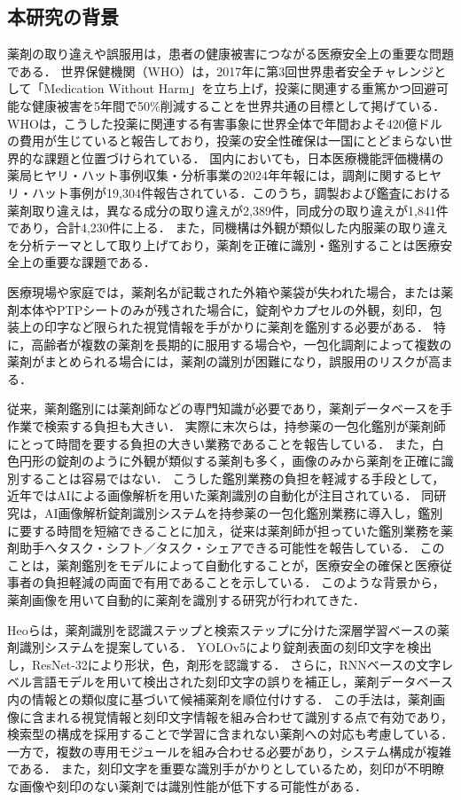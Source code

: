 \documentclass[dvipdfmx]{jsarticle}
\begin{document}
\subsection{本研究の背景}

薬剤の取り違えや誤服用は，患者の健康被害につながる医療安全上の重要な問題である．
世界保健機関（WHO）は，2017年に第3回世界患者安全チャレンジとして「Medication Without Harm」を立ち上げ，投薬に関連する重篤かつ回避可能な健康被害を5年間で50\%削減することを世界共通の目標として掲げている\cite{who_medication}．
WHOは，こうした投薬に関連する有害事象に世界全体で年間およそ420億ドルの費用が生じていると報告しており，投薬の安全性確保は一国にとどまらない世界的な課題と位置づけられている．
国内においても，日本医療機能評価機構の薬局ヒヤリ・ハット事例収集・分析事業の2024年年報には，調剤に関するヒヤリ・ハット事例が19,304件報告されている．このうち，調製および鑑査における薬剤取り違えは，異なる成分の取り違えが2,389件，同成分の取り違えが1,841件であり，合計4,230件に上る\cite{jcqhc_hiyari}．
また，同機構は外観が類似した内服薬の取り違えを分析テーマとして取り上げており，薬剤を正確に識別・鑑別することは医療安全上の重要な課題である\cite{jcqhc_similarity}．

医療現場や家庭では，薬剤名が記載された外箱や薬袋が失われた場合，または薬剤本体やPTPシートのみが残された場合に，錠剤やカプセルの外観，刻印，包装上の印字など限られた視覚情報を手がかりに薬剤を鑑別する必要がある．
特に，高齢者が複数の薬剤を長期的に服用する場合や，一包化調剤によって複数の薬剤がまとめられる場合には，薬剤の識別が困難になり，誤服用のリスクが高まる．

従来，薬剤鑑別には薬剤師などの専門知識が必要であり，薬剤データベースを手作業で検索する負担も大きい．
実際に末次ら\cite{suetsugu2026ai}は，持参薬の一包化鑑別が薬剤師にとって時間を要する負担の大きい業務であることを報告している．
また，白色円形の錠剤のように外観が類似する薬剤も多く，画像のみから薬剤を正確に識別することは容易ではない．
こうした鑑別業務の負担を軽減する手段として，近年ではAIによる画像解析を用いた薬剤識別の自動化が注目されている．
同研究\cite{suetsugu2026ai}は，AI画像解析錠剤識別システムを持参薬の一包化鑑別業務に導入し，鑑別に要する時間を短縮できることに加え，従来は薬剤師が担っていた鑑別業務を薬剤助手へタスク・シフト／タスク・シェアできる可能性を報告している．
このことは，薬剤鑑別をモデルによって自動化することが，医療安全の確保と医療従事者の負担軽減の両面で有用であることを示している．
このような背景から，薬剤画像を用いて自動的に薬剤を識別する研究が行われてきた．

Heoら\cite{heo2023pill}は，薬剤識別を認識ステップと検索ステップに分けた深層学習ベースの薬剤識別システムを提案している．
YOLOv5により錠剤表面の刻印文字を検出し，ResNet-32により形状，色，剤形を認識する．
さらに，RNNベースの文字レベル言語モデルを用いて検出された刻印文字の誤りを補正し，薬剤データベース内の情報との類似度に基づいて候補薬剤を順位付けする．
この手法は，薬剤画像に含まれる視覚情報と刻印文字情報を組み合わせて識別する点で有効であり，検索型の構成を採用することで学習に含まれない薬剤への対応も考慮している．
一方で，複数の専用モジュールを組み合わせる必要があり，システム構成が複雑である．
また，刻印文字を重要な識別手がかりとしているため，刻印が不明瞭な画像や刻印のない薬剤では識別性能が低下する可能性がある．
\end{document}
